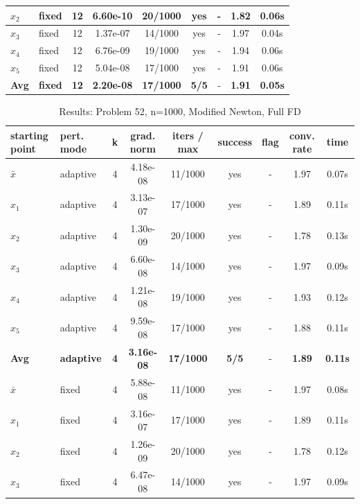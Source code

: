 \begin{longtable}{|l|l|c|c|c|c|c|c|c|}
\hline
$x_2$ & fixed & 12 & 6.60e-10 & 20/1000 & yes & - & 1.82 & 0.06s \\
\hline
$x_3$ & fixed & 12 & 1.37e-07 & 14/1000 & yes & - & 1.97 & 0.04s \\
\hline
$x_4$ & fixed & 12 & 6.76e-09 & 19/1000 & yes & - & 1.94 & 0.06s \\
\hline
$x_5$ & fixed & 12 & 5.04e-08 & 17/1000 & yes & - & 1.91 & 0.06s \\
\hline
\hline\hline
\textbf{Avg} & \textbf{fixed} & \textbf{12} & \textbf{2.20e-08} & \textbf{17/1000} & \textbf{5/5} & - & \textbf{1.91} & \textbf{0.05s} \\
\hline\hline
\end{longtable}


\begin{longtable}{|l|l|c|c|c|c|c|c|c|}
\caption{Results: Problem 52, n=1000, Modified Newton, Full FD} \\
\hline
\textbf{starting point} & \textbf{pert. mode} & \textbf{k} & \textbf{grad. norm} & \textbf{iters / max} & \textbf{success} & \textbf{flag} & \textbf{conv. rate} & \textbf{time} \\
\hline
\endfirsthead
\endhead
\endfoot
\hline
\endlastfoot
$\bar{x}$ & adaptive & 4 & 4.18e-08 & 11/1000 & yes & - & 1.97 & 0.07s \\
\hline
$x_1$ & adaptive & 4 & 3.13e-07 & 17/1000 & yes & - & 1.89 & 0.11s \\
\hline
$x_2$ & adaptive & 4 & 1.30e-09 & 20/1000 & yes & - & 1.78 & 0.13s \\
\hline
$x_3$ & adaptive & 4 & 6.60e-08 & 14/1000 & yes & - & 1.97 & 0.09s \\
\hline
$x_4$ & adaptive & 4 & 1.21e-08 & 19/1000 & yes & - & 1.93 & 0.12s \\
\hline
$x_5$ & adaptive & 4 & 9.59e-08 & 17/1000 & yes & - & 1.88 & 0.11s \\
\hline
\hline\hline
\textbf{Avg} & \textbf{adaptive} & \textbf{4} & \textbf{3.16e-08} & \textbf{17/1000} & \textbf{5/5} & - & \textbf{1.89} & \textbf{0.11s} \\
\hline\hline
\hline
$\bar{x}$ & fixed & 4 & 5.88e-08 & 11/1000 & yes & - & 1.97 & 0.08s \\
\hline
$x_1$ & fixed & 4 & 3.16e-07 & 17/1000 & yes & - & 1.89 & 0.11s \\
\hline
$x_2$ & fixed & 4 & 1.26e-09 & 20/1000 & yes & - & 1.78 & 0.12s \\
\hline
$x_3$ & fixed & 4 & 6.47e-08 & 14/1000 & yes & - & 1.97 & 0.09s \\

\end{longtable}
